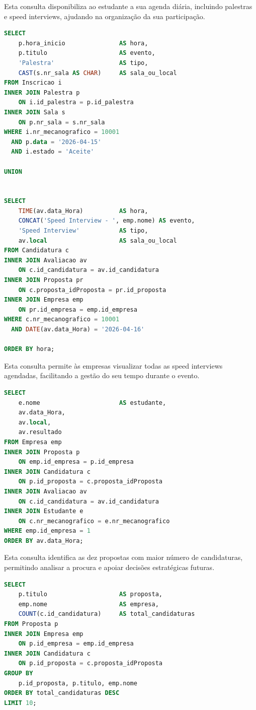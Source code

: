 \documentclass[12pt,a4paper]{article}
\begin{document}
\newpage

Esta consulta disponibiliza ao estudante a sua agenda diária, incluindo palestras e speed interviews, ajudando na organização da sua participação.
\begin{lstlisting}[language=SQL,caption={Comando SQL que traduz o RM07}, label={lst:roles}]
SELECT 
    p.hora_inicio               AS hora,
    p.titulo                    AS evento,
    'Palestra'                  AS tipo,
    CAST(s.nr_sala AS CHAR)     AS sala_ou_local
FROM Inscricao i
INNER JOIN Palestra p 
    ON i.id_palestra = p.id_palestra
INNER JOIN Sala s 
    ON p.nr_sala = s.nr_sala
WHERE i.nr_mecanografico = 10001
  AND p.data = '2026-04-15'
  AND i.estado = 'Aceite'

UNION


SELECT 
    TIME(av.data_Hora)          AS hora,
    CONCAT('Speed Interview - ', emp.nome) AS evento,
    'Speed Interview'           AS tipo,
    av.local                    AS sala_ou_local
FROM Candidatura c 
INNER JOIN Avaliacao av 
    ON c.id_candidatura = av.id_candidatura
INNER JOIN Proposta pr 
    ON c.proposta_idProposta = pr.id_proposta
INNER JOIN Empresa emp 
    ON pr.id_empresa = emp.id_empresa
WHERE c.nr_mecanografico = 10001
  AND DATE(av.data_Hora) = '2026-04-16'

ORDER BY hora;
\end{lstlisting}
\newpage

Esta consulta permite às empresas visualizar todas as speed interviews agendadas, facilitando a gestão do seu tempo durante o evento.
\begin{lstlisting}[language=SQL,caption={Comando SQL que traduz o RM08}, label={lst:roles}]
SELECT 
    e.nome                      AS estudante,
    av.data_Hora,
    av.local,
    av.resultado
FROM Empresa emp
INNER JOIN Proposta p 
    ON emp.id_empresa = p.id_empresa
INNER JOIN Candidatura c 
    ON p.id_proposta = c.proposta_idProposta
INNER JOIN Avaliacao av 
    ON c.id_candidatura = av.id_candidatura
INNER JOIN Estudante e 
    ON c.nr_mecanografico = e.nr_mecanografico
WHERE emp.id_empresa = 1
ORDER BY av.data_Hora;

\end{lstlisting}

\newpage

Esta consulta identifica as dez propostas com maior número de candidaturas,
permitindo analisar a procura e apoiar decisões estratégicas futuras.
\begin{lstlisting}[language=SQL,caption={Comando SQL que traduz o RM09}, label={lst:roles}]
SELECT 
    p.titulo                    AS proposta,
    emp.nome                    AS empresa,
    COUNT(c.id_candidatura)     AS total_candidaturas
FROM Proposta p
INNER JOIN Empresa emp 
    ON p.id_empresa = emp.id_empresa
INNER JOIN Candidatura c 
    ON p.id_proposta = c.proposta_idProposta
GROUP BY 
    p.id_proposta, p.titulo, emp.nome
ORDER BY total_candidaturas DESC
LIMIT 10;
\end{lstlisting}
\end{document}
